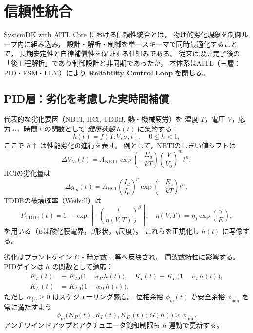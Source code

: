 \section{信頼性統合}

SystemDK with AITL Core における信頼性統合とは，
物理的劣化現象を制御ループ内に組み込み，
設計・解析・制御を単一スキーマで同時最適化することで，
長期安定性と自律補償性を保証する仕組みである。
従来は設計完了後の「後工程解析」であり制御設計と非同期であったが，
本体系はAITL（三層：PID・FSM・LLM）により
\textbf{Reliability-Control Loop} を閉じる。

\subsection{PID層：劣化を考慮した実時間補償}
代表的な劣化要因（NBTI, HCI, TDDB, 熱・機械疲労）を
温度 $T$，電圧 $V$，応力 $\sigma$，時間 $t$ の関数として
\emph{健康状態} $h(t)$ に集約する：
\begin{equation}
h(t) = f(T,V,\sigma,t),\quad 0 \le h < 1,
\label{eq:health}
\end{equation}
ここで $h \!\uparrow$ は性能劣化の進行を表す。
例として，NBTIのしきい値シフトは
\begin{equation}
\Delta V_{th}(t) = A_{\mathrm{NBTI}}\,
\exp\!\left(-\frac{E_a}{k T}\right)\!
\left(\frac{V}{V_0}\right)^{m} t^{n},
\label{eq:nbti}
\end{equation}
HCIの劣化量は
\begin{equation}
\Delta g_m(t) = A_{\mathrm{HCI}}\,
\left(\frac{I_d}{I_0}\right)^{p}
\exp\!\left(-\frac{E_a}{k T}\right) t^{n},
\label{eq:hci}
\end{equation}
TDDBの破壊確率（Weibull）は
\begin{equation}
F_{\mathrm{TDDB}}(t)=1-\exp\!\left[-\left(\frac{t}{\eta(V,T)}\right)^{\beta}\right],
\quad \eta(V,T)=\eta_0 \exp\!\left(\frac{\gamma}{E}\right),
\label{eq:tddb}
\end{equation}
を用いる（$E$は酸化膜電界，$\beta$形状，$\eta$尺度）。
これらを正規化し $h(t)$ に写像する。

劣化はプラントゲイン $G$・時定数 $\tau$ 等へ反映され，
周波数特性に影響する。PIDゲインは $h$ の関数として適応：
\begin{align}
K_P(t) &= K_{P0}\bigl(1 - \alpha_P\,h(t)\bigr),\quad
K_I(t) = K_{I0}\bigl(1 - \alpha_I\,h(t)\bigr), \label{eq:gain_sched}\\
K_D(t) &= K_{D0}\bigl(1 - \alpha_D\,h(t)\bigr),
\end{align}
ただし $\alpha_{\{\cdot\}}\!\ge 0$ はスケジューリング感度。
位相余裕 $\phi_m(t)$ が安全余裕 $\phi_{\min}$ を常に満たすよう
\begin{equation}
\phi_m\bigl(K_P(t),K_I(t),K_D(t);\,G(h)\bigr) \ge \phi_{\min}.
\label{eq:pm}
\end{equation}
アンチワインドアップとアクチュエータ飽和制限も $h$ 連動で更新する。

